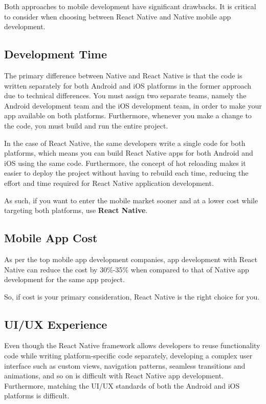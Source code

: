 Both approaches to mobile development have significant drawbacks.
It is critical to consider when choosing between React Native and Native mobile app development.

\subsection{Development Time}

The primary difference between Native and React Native is that the code is written separately for both Android and iOS
platforms in the former approach due to technical differences.
You must assign two separate teams, namely the Android development team and the iOS development team, in order to make
your app available on both platforms.
Furthermore, whenever you make a change to the code, you must build and run the entire project.

In the case of React Native, the same developers write a single code for both platforms, which means you can build
React Native apps for both Android and iOS using the same code.
Furthermore, the concept of hot reloading makes it easier to deploy the project without having to rebuild each time,
reducing the effort and time required for React Native application development.

As such, if you want to enter the mobile market sooner and at a lower cost while targeting both platforms, use
\textbf{React Native}.

\subsection{Mobile App Cost}

As per the top mobile app development companies, app development with React Native can reduce the cost by 30\%-35\%
when compared to that of Native app development for the same app project.

So, if cost is your primary consideration, React Native is the right choice for you.

\subsection{UI/UX Experience}

Even though the React Native framework allows developers to reuse functionality code while writing platform-specific
code separately, developing a complex user interface such as custom views, navigation patterns, seamless transitions
and animations, and so on is difficult with React Native app development.
Furthermore, matching the UI/UX standards of both the Android and iOS platforms is difficult.


